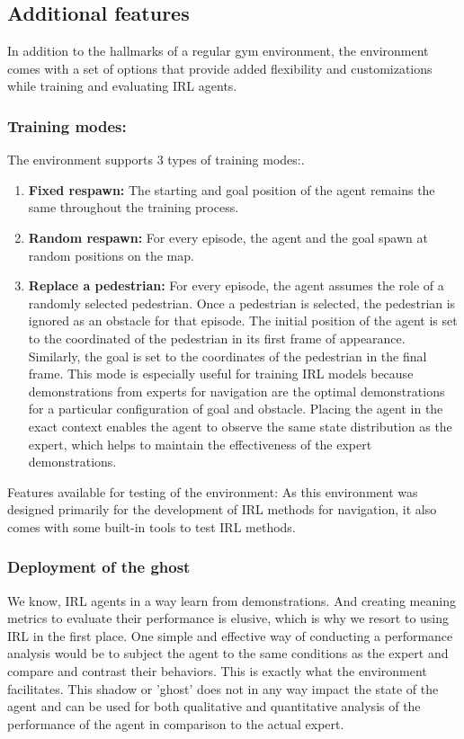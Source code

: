 \subsection{Additional features}
In addition to the hallmarks of a regular gym environment, the environment comes with a set of options that provide added flexibility and customizations while training and evaluating IRL agents.
\subsubsection{Training modes:}
The environment supports 3 types of training modes:. 
\begin{enumerate}
    \item \textbf{Fixed respawn:} The starting and goal position of the agent remains the same throughout the training process.
    \item \textbf{Random respawn:} For every episode, the agent and the goal spawn at random positions on the map. 
    \item \textbf{Replace a pedestrian:} For every episode, the agent assumes the role of a randomly selected pedestrian. Once a pedestrian is selected, the pedestrian is ignored as an obstacle for that episode. The initial position of the agent is set to the coordinated of the pedestrian in its first frame of appearance. Similarly, the goal is set to the coordinates of the pedestrian in the final frame.
    This mode is especially useful for training IRL models because demonstrations from experts for navigation are the optimal demonstrations for a particular configuration of goal and obstacle. Placing the agent in the exact context enables the agent to observe the same state distribution as the expert, which helps to maintain the effectiveness of the expert demonstrations. 
\end{enumerate}
Features available for testing of the environment:
As this environment was designed primarily for the development of IRL methods for navigation, it also comes with some built-in tools to test IRL methods.
\subsubsection{Deployment of the ghost}
We know, IRL agents in a way learn from demonstrations. And creating meaning metrics to evaluate their performance is elusive, which is why we resort to using IRL in the first place. One simple and effective way of conducting a performance analysis would be to subject the agent to the same conditions as the expert and compare and contrast their behaviors. This is exactly what the environment facilitates. This shadow or 'ghost' does not in any way impact the state of the agent and can be used for both qualitative and quantitative analysis of the performance of the agent in comparison to the actual expert. 

